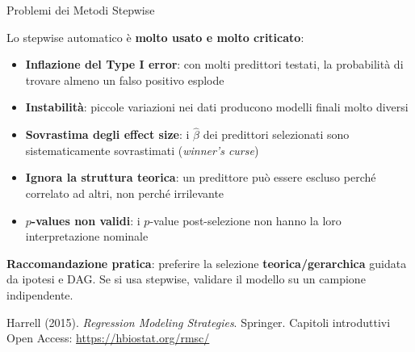 \documentclass[
  ignorenonframetext,
]{beamer}
\begin{document}
\begin{frame}{Problemi dei Metodi Stepwise}
\label{problemi-dei-metodi-stepwise}
\small

Lo stepwise automatico è \textbf{molto usato e molto criticato}:

\vspace{0.3em}

\begin{itemize}\small
\item \textbf{Inflazione del Type I error}: con molti predittori testati, la probabilità di trovare almeno un falso positivo esplode
\item \textbf{Instabilità}: piccole variazioni nei dati producono modelli finali molto diversi
\item \textbf{Sovrastima degli effect size}: i $\hat{\beta}$ dei predittori selezionati sono sistematicamente sovrastimati (\emph{winner's curse})
\item \textbf{Ignora la struttura teorica}: un predittore può essere escluso perché correlato ad altri, non perché irrilevante
\item \textbf{$p$-values non validi}: i $p$-value post-selezione non hanno la loro interpretazione nominale
\end{itemize}

\vspace{0.3em}

\footnotesize \textbf{Raccomandazione pratica}: preferire la selezione
\textbf{teorica/gerarchica} guidata da ipotesi e DAG. Se si usa
stepwise, validare il modello su un campione indipendente.

\vspace{0.2em}

\tiny Harrell (2015). \emph{Regression Modeling Strategies}. Springer.
Capitoli introduttivi Open Access: \url{https://hbiostat.org/rmsc/}
\end{frame}
\end{document}
